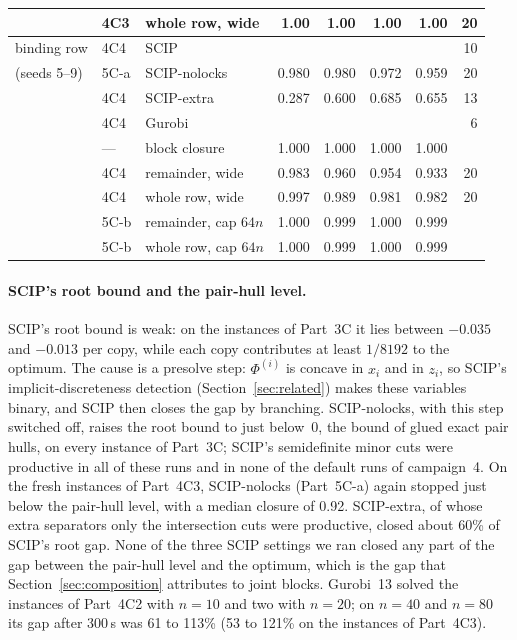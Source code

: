 \begin{table}[t]
\begin{tabular}{@{}lllrrrrr@{}}
 & 4C3 & whole row, wide & 1.00 & 1.00 & 1.00 & 1.00 & 20\\
\midrule
binding row & 4C4 & SCIP & & & & & 10\\
(seeds 5--9) & 5C-a & SCIP-nolocks & 0.980 & 0.980 & 0.972 & 0.959 & 20\\
 & 4C4 & SCIP-extra & 0.287 & 0.600 & 0.685 & 0.655 & 13\\
 & 4C4 & Gurobi & & & & & 6\\
 & --- & block closure & 1.000 & 1.000 & 1.000 & 1.000 & \\
 & 4C4 & remainder, wide & 0.983 & 0.960 & 0.954 & 0.933 & 20\\
 & 4C4 & whole row, wide & 0.997 & 0.989 & 0.981 & 0.982 & 20\\
 & 5C-b & remainder, cap $64n$ & 1.000 & 0.999 & 1.000 & 0.999 & \\
 & 5C-b & whole row, cap $64n$ & 1.000 & 0.999 & 1.000 & 0.999 & \\
\bottomrule
\end{tabular}
\end{table}

\paragraph{SCIP's root bound and the pair-hull level.} SCIP's root bound is
weak: on the instances of Part~3C it lies between $-0.035$ and $-0.013$ per
copy, while each copy contributes at least $1/8192$ to the optimum. The cause
is a presolve step: $\Phi^{(i)}$ is concave in $x_i$ and in $z_i$, so SCIP's
implicit-discreteness detection (Section~\ref{sec:related}) makes these
variables binary, and SCIP then closes the gap by branching. SCIP-nolocks,
with this step switched off, raises the root bound to just below~0, the bound
of glued exact pair hulls, on every instance of Part~3C; SCIP's semidefinite
minor cuts were productive in all of these runs and in none of the default
runs of campaign~4. On the fresh instances of Part~4C3, SCIP-nolocks
(Part~5C-a) again stopped just below the pair-hull level, with a median
closure of 0.92. SCIP-extra, of whose extra separators only the
intersection cuts were productive, closed about 60\% of SCIP's root gap. None
of the three SCIP settings we ran closed any part of the gap between the
pair-hull level and the optimum, which is the gap that
Section~\ref{sec:composition} attributes to joint blocks. Gurobi~13 solved the
instances of Part~4C2 with $n=10$ and two with $n=20$; on $n=40$ and $n=80$ its
gap after 300\,s was 61 to 113\% (53 to 121\% on the instances of Part~4C3).

